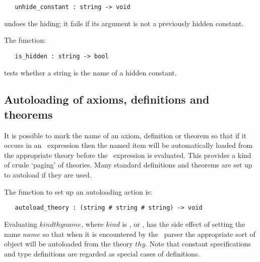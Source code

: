 {{\begin{boxed}
\begin{verbatim}
   unhide_constant : string -> void
\end{verbatim}\end{boxed}

\noindent undoes the hiding; it fails if its argument is not a previously 
hidden constant.

The function:

\begin{boxed}
\begin{verbatim}
   is_hidden : string -> bool
\end{verbatim}\end{boxed}

\noindent tests whether a string is the name of a hidden constant.

\subsection{Autoloading of axioms, definitions and theorems}

It is possible to mark the name of an axiom, definition or  theorem so that
if it occurs in an \ML\ expression  then the  named item  will be automatically
loaded from  the appropriate  theory before  the \ML\  expression is evaluated.
This provides a kind of crude `paging' of theories.   Many standard definitions
and theorems are set up to autoload
 if they are used.

The function to set up an autoloading action is:

\begin{boxed}
\begin{verbatim}
   autoload_theory : (string # string # string) -> void
\end{verbatim}\end{boxed}

\noindent Evaluating
$kind$$thy$$name$, where   $kind$
is ,  or , has the  side effect of setting
the name  $name$  so  that  when  it  is  encountered by  the  \ML\ parser the
appropriate sort of object will be autoloaded from the theory $thy$.   Note that
constant specifications and type definitions are  regarded as  special cases of
definitions.

}}
